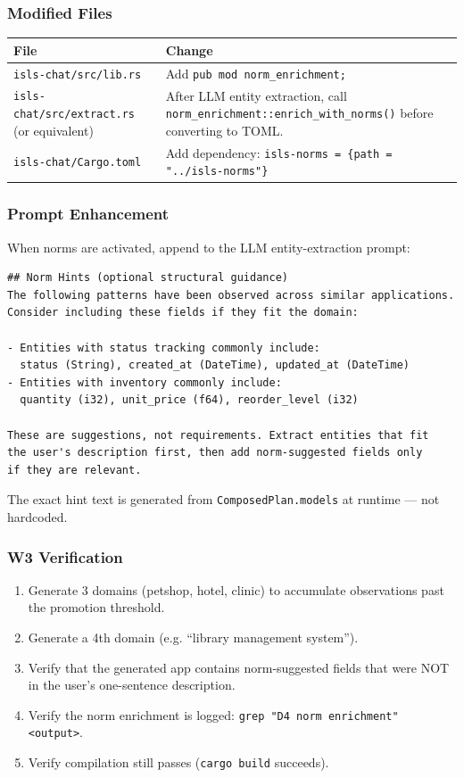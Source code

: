\documentclass[11pt,a4paper]{article}
\begin{document}
\subsubsection{Modified Files}

\begin{longtable}{lp{10cm}}
\toprule
\textbf{File} & \textbf{Change} \\
\midrule
\texttt{isls-chat/src/lib.rs}
  & Add \texttt{pub mod norm\_enrichment;} \\
\texttt{isls-chat/src/extract.rs} (or equivalent)
  & After LLM entity extraction, call 
    \texttt{norm\_enrichment::enrich\_with\_norms()} before converting 
    to TOML. \\
\texttt{isls-chat/Cargo.toml}
  & Add dependency: \texttt{isls-norms = \{path = "../isls-norms"\}} \\
\bottomrule
\end{longtable}

\subsubsection{Prompt Enhancement}

When norms are activated, append to the LLM entity-extraction prompt:

\begin{lstlisting}[style=bash]
## Norm Hints (optional structural guidance)
The following patterns have been observed across similar applications.
Consider including these fields if they fit the domain:

- Entities with status tracking commonly include:
  status (String), created_at (DateTime), updated_at (DateTime)
- Entities with inventory commonly include:
  quantity (i32), unit_price (f64), reorder_level (i32)

These are suggestions, not requirements. Extract entities that fit
the user's description first, then add norm-suggested fields only
if they are relevant.
\end{lstlisting}

The exact hint text is generated from \texttt{ComposedPlan.models} 
at runtime --- not hardcoded.

\subsubsection{W3 Verification}

\begin{enumerate}[nosep]
\item Generate 3 domains (petshop, hotel, clinic) to accumulate 
      observations past the promotion threshold.
\item Generate a 4th domain (e.g. ``library management system'').
\item Verify that the generated app contains norm-suggested fields 
      that were NOT in the user's one-sentence description.
\item Verify the norm enrichment is logged: 
      \texttt{grep "D4 norm enrichment" <output>}.
\item Verify compilation still passes (\texttt{cargo build} succeeds).
\end{enumerate}
\end{document}
